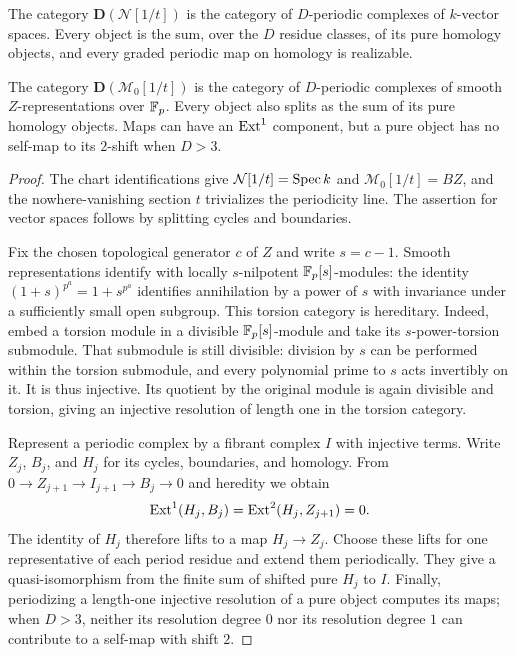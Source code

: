 \begin{lemma}
\label{complete:open-splitting}
The category $\mathbf D(\mathcal N[1/t])$ is the category of
$D$-periodic complexes of $k$-vector spaces. Every object is the sum,
over the $D$ residue classes, of its pure homology objects, and every
graded periodic map on homology is realizable.

The category $\mathbf D(\mathcal M_0[1/t])$ is the category of
$D$-periodic complexes of smooth $Z$-representations over $\mathbb F_p$.
Every object also splits as the sum of its pure homology objects.
Maps can have an $\operatorname{Ext}^1$ component, but a pure object has no
self-map to its $2$-shift when $D>3$.
\end{lemma}

\begin{proof}
The chart identifications give
$\mathcal N[1/t]=\operatorname{Spec} k$ and
$\mathcal M_0[1/t]=BZ$, and the nowhere-vanishing section $t$
trivializes the periodicity line. The assertion for vector spaces
follows by splitting cycles and boundaries.

Fix the chosen topological generator $c$ of $Z$ and write $s=c-1$.
Smooth representations identify with locally $s$-nilpotent
$\mathbb F_p[s]$-modules: the identity
$(1+s)^{p^a}=1+s^{p^a}$ identifies annihilation by a power of $s$
with invariance under a sufficiently small open subgroup. This
torsion category is hereditary. Indeed, embed a torsion module in a
divisible $\mathbb F_p[s]$-module and take its $s$-power-torsion submodule.
That submodule is still divisible: division by $s$ can be performed
within the torsion submodule, and every polynomial prime to $s$ acts
invertibly on it. It is thus injective. Its quotient by the original
module is again divisible and torsion, giving an injective resolution
of length one in the torsion category.

Represent a periodic complex by a fibrant complex $I$ with injective
terms. Write $Z_j$, $B_j$, and $H_j$ for its cycles, boundaries, and
homology. From $0\to Z_{j+1}\to I_{j+1}\to B_j\to 0$ and
heredity we obtain
\[
 \operatorname{Ext}^1(H_j,B_j)=\operatorname{Ext}^2(H_j,Z_{j+1})=0.
\]
The identity of $H_j$ therefore lifts to a map $H_j\to Z_j$.
Choose these lifts for one representative of each period residue and
extend them periodically. They give a quasi-isomorphism from the
finite sum of shifted pure $H_j$ to $I$. Finally, periodizing a
length-one injective resolution of a pure object computes its maps;
when $D>3$, neither its resolution degree $0$ nor its resolution
degree $1$ can contribute to a self-map with shift $2$.
\end{proof}

